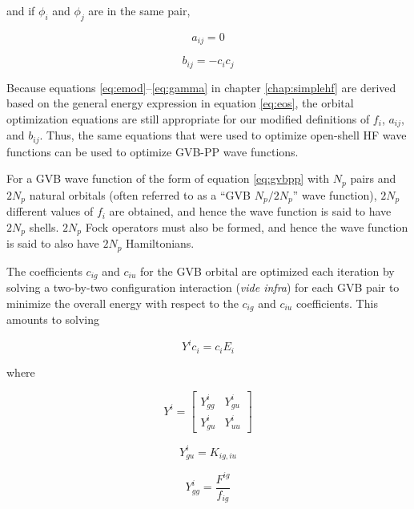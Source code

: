 \noindent and if $\phi_i$ and $\phi_j$ are in the same pair,

\begin{equation}
	a_{ij} = 0
\end{equation}

\begin{equation}
	b_{ij} = -c_ic_j
\end{equation}

Because equations \ref{eq:emod}--\ref{eq:gamma} in chapter
\ref{chap:simplehf} are derived based on the general energy expression in
equation \ref{eq:eos}, the orbital optimization equations are still
appropriate for our modified definitions of $f_i$, $a_{ij}$, and
$b_{ij}$. Thus, the same equations that were used to optimize
open-shell HF wave functions can be used to optimize GVB-PP wave
functions.

For a GVB wave function of the form of equation \ref{eq:gvbpp} with
$N_p$ pairs and $2N_p$ natural orbitals (often referred to as a ``GVB
$N_p/2N_p$'' wave function), $2N_p$ different values of $f_i$ are
obtained, and hence the wave function is said to have $2N_p$ shells.
$2N_p$ Fock operators must also be formed, and hence the wave function
is said to also have $2N_p$ Hamiltonians.

The coefficients $c_{ig}$ and $c_{iu}$ for the GVB orbital are
optimized each iteration \cite{Bobrowicz77, Bair77} by solving a
two-by-two configuration interaction (\emph{vide infra}) for each GVB
pair to minimize the overall energy with respect to the $c_{ig}$ and
$c_{iu}$ coefficients. This amounts to solving \cite{Bobrowicz77}

\begin{equation}
	Y^ic_i = c_iE_i
\label{eq:gvbcoef}
\end{equation}

\noindent where

\begin{equation}
  Y^i =  \left[\begin{array}{cc}
	Y^i_{gg} & Y^i_{gu} \\
	Y^i_{gu} & Y^i_{uu} 
	\end{array} \right]
\end{equation}

\begin{equation}
  Y^i_{gu} = K_{ig,iu}
\end{equation}

\begin{equation}
  Y^i_{gg} = \frac{F^{ig}}{f_{ig}}
\end{equation}

